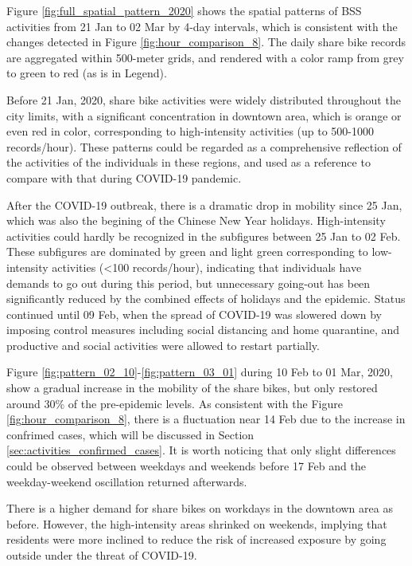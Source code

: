 \documentclass[ijgi,submit,moreauthors,pdftex]{Definitions/mdpi}
\begin{document}
Figure \ref{fig:full_spatial_pattern_2020} shows the spatial patterns of BSS activities from 21 Jan to 02 Mar by 4-day intervals, which is consistent with the changes detected in Figure \ref{fig:hour_comparison_8}. %
The daily share bike records are aggregated within 500-meter grids, and rendered with a color ramp from grey to green to red (as is in Legend).

Before 21 Jan, 2020, share bike activities were widely distributed throughout the city limits, with a significant concentration in downtown area, which is orange or even red in color, corresponding to high-intensity activities (up to 500-1000 records/hour).
These patterns could be regarded as a comprehensive reflection of the activities of the individuals in these regions, and used as a reference to compare with that during COVID-19 pandemic.

After the COVID-19 outbreak, there is a dramatic drop in mobility since 25 Jan, which was also the begining of the Chinese New Year holidays.
High-intensity activities could hardly be recognized in the subfigures between 25 Jan to 02 Feb. 
These subfigures are dominated by green and light green corresponding to low-intensity activities (<100 records/hour), indicating that individuals have demands to go out during this period, but unnecessary going-out has been significantly reduced by the combined effects of holidays and the epidemic.
Status continued until 09 Feb, when the spread of COVID-19 was slowered down by imposing control measures including social distancing and home quarantine, and productive and social activities were allowed to restart partially.

Figure \ref{fig:pattern_02_10}-\ref{fig:pattern_03_01} during 10 Feb to 01 Mar, 2020, show a gradual increase in the mobility of the share bikes, but only restored around $30\%$ of the pre-epidemic levels.
As consistent with the Figure \ref{fig:hour_comparison_8}, there is a fluctuation near 14 Feb due to the increase in confrimed cases, which will be discussed in Section \ref{sec:activities_confirmed_cases}.
It is worth noticing that only slight differences could be observed between weekdays and weekends before 17 Feb and the weekday-weekend oscillation returned afterwards.

There is a higher demand for share bikes on workdays in the downtown area as before.
However, the high-intensity areas shrinked on weekends, implying that residents were more inclined to reduce the risk of increased exposure by going outside under the threat of COVID-19. 
\end{document}
